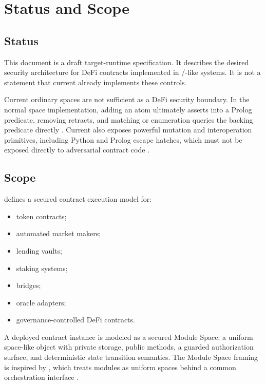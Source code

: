 \section{Status and Scope}

\subsection{Status}

This document is a draft target-runtime specification. It describes the desired security architecture for DeFi contracts implemented in \MeTTa{}/\PeTTa{}-like systems. It is not a statement that current \PeTTa{} already implements these controls.

Current ordinary \PeTTa{} spaces are not sufficient as a DeFi security boundary. In the normal space implementation, adding an atom ultimately asserts into a Prolog predicate, removing retracts, and matching or enumeration queries the backing predicate directly \cite{petta-spaces}. Current \PeTTa{} also exposes powerful mutation and interoperation primitives, including Python and Prolog escape hatches, which must not be exposed directly to adversarial contract code \cite{petta-metta}.

\subsection{Scope}

\SCS{} defines a secured contract execution model for:

\begin{itemize}
  \item token contracts;
  \item automated market makers;
  \item lending vaults;
  \item staking systems;
  \item bridges;
  \item oracle adapters;
  \item governance-controlled DeFi contracts.
\end{itemize}

A deployed contract instance is modeled as a secured Module Space: a uniform space-like object with private storage, public methods, a guarded authorization surface, and deterministic state transition semantics. The Module Space framing is inspired by \HyperClaw{}, which treats modules as uniform spaces behind a common orchestration interface \cite{hyperclaw}.

